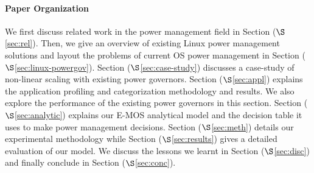 \paragraph{Paper Organization} 
We first discuss related work in the power management field in Section ($\S$\ref{sec:rel}). 
Then, we give an overview of existing Linux power management solutions and layout the problems of current 
OS power management in Section ($\S$\ref{sec:linux-powergov}). Section ($\S$\ref{sec:case-study})
discusses a case-study of non-linear scaling with existing power governors.
Section ($\S$\ref{sec:appl}) explains the application profiling and categorization methodology and results. We also explore the performance of 
the existing power governors in this section. Section ($\S$\ref{sec:analytic}) explains
our E-MOS analytical model and the decision table it uses to make power management decisions. Section ($\S$\ref{sec:meth}) details our experimental methodology 
while Section ($\S$\ref{sec:results}) gives a detailed evaluation of our model. We discuss the
lessons we learnt in Section ($\S$\ref{sec:disc}) and finally conclude in Section ($\S$\ref{sec:conc}).


\begin{comment}

This is the old second paragraph, which I've rewritten.

Linux OS provide ACPI~\cite{acpi, freqgov} interfaces to extract information about batteries and other resources, but the power governors don't utilize this information efficiently to make proper energy management decisions. Current policies generally rely on user-specified static parameters to run at a specific lower CPU frequency or lower system power state without considering the applications’ requirements. Many multi-core processors try to improve the applications execution time by running at higher frequencies and thus consume more power (May consume less energy, if the execution time is small). Some applications have more memory accesses, in which case running at higher frequencies always is not beneficial. Many applications are long running jobs which consume lot of energy if run at higher frequency. All these above scenarios suggest that there is ‘NO’ one-size fit all solution for better system energy efficiency. Thus, Linux power governors need more application information, to determine whether to boost the performance or run at lower-power state by continuously monitoring the available battery resource. Our project aims to solve this problem of energy management decision by deriving some of the principles from Liang et. al~\cite{and-dvfs} implemented for Android systems.

\end{comment}

